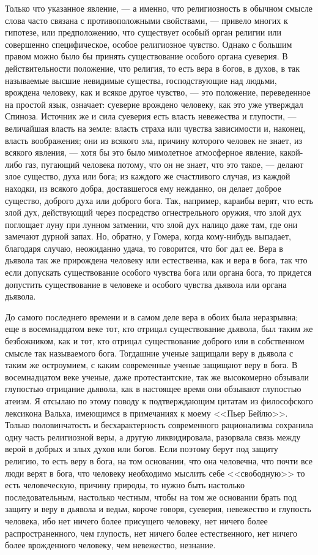 \documentclass[12pt]{article}
\begin{document}
Только что указанное явление, --- а именно, что религиозность в обычном смысле слова часто связана с противоположными свойствами, --- привело многих к гипотезе, или предположению, что существует особый орган религии или совершенно специфическое, особое религиозное чувство. Однако с большим правом можно было бы принять существование особого органа суеверия. В действительности положение, что религия, то есть вера в богов, в духов, в так называемые высшие невидимые существа, господствующие над людьми, врождена человеку, как и всякое другое чувство, --- это положение, переведенное на простой язык, означает: суеверие врождено человеку, как это уже утверждал Спиноза. Источник же и сила суеверия есть власть невежества и глупости, --- величайшая власть на земле: власть страха или чувства зависимости и, наконец, власть воображения; они из всякого зла, причину которого человек не знает, из всякого явления, --- хотя бы это было мимолетное атмосферное явление, какой-либо газ, пугающий человека потому, что он не знает, что это такое, --- делают злое существо, духа или бога; из каждого же счастливого случая, из каждой находки, из всякого добра, доставшегося ему нежданно, он делает доброе существо, доброго духа или доброго бога. Так, например, караибы верят, что есть злой дух, действующий через посредство огнестрельного оружия, что злой дух поглощает луну при лунном затмении, что злой дух налицо даже там, где они замечают дурной запах. Но, обратно, у Гомера, когда кому-нибудь выпадает, благодаря случаю, неожиданно удача, то говорится, что бог дал ее. Вера в дьявола так же прирождена человеку или естественна, как и вера в бога, так что если допускать существование особого чувства бога или органа бога, то придется допустить существование в человеке и особого чувства дьявола или органа дьявола. 

До самого последнего времени и в самом деле вера в обоих была неразрывна; еще в восемнадцатом веке тот, кто отрицал существование дьявола, был таким же безбожником, как и тот, кто отрицал существование доброго или в собственном смысле так называемого бога. Тогдашние ученые защищали веру в дьявола с таким же остроумием, с каким современные ученые защищают веру в бога. В восемнадцатом веке ученые, даже протестантские, так же высокомерно обзывали глупостью отрицание дьявола, как в настоящее время они обзывают глупостью атеизм. Я отсылаю по этому поводу к подтверждающим цитатам из философского лексикона Вальха, имеющимся в примечаниях к моему <<Пьер Бейлю>>. Только половинчатость и бесхарактерность современного рационализма сохранила одну часть религиозной веры, а другую ликвидировала, разорвала связь между верой в добрых и злых духов или богов. Если поэтому берут под защиту религию, то есть веру в бога, на том основании, что она человечна, что почти все люди верят в бога, что человеку необходимо мыслить себе <<свободную>>  то есть человеческую, причину природы, то нужно быть настолько последовательным, настолько честным, чтобы на том же основании брать под защиту и веру в дьявола и ведьм, короче говоря, суеверия, невежество и глупость человека, ибо нет ничего более присущего человеку, нет ничего более распространенного, чем глупость, нет ничего более естественного, нет ничего более врожденного человеку, чем невежество, незнание. 
\end{document}
